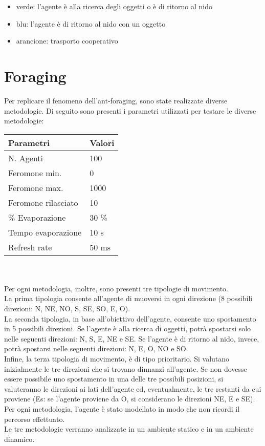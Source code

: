 \documentclass[12pt,a4paper,openright,twoside]{report}
\begin{document}
\begin{itemize}
	\item verde: l'agente è alla ricerca degli oggetti o è di ritorno al nido
	\item blu: l'agente è di ritorno al nido con un oggetto
	\item arancione: trasporto cooperativo
\end{itemize}

\section{Foraging}

Per replicare il fenomeno dell'ant-foraging, sono state realizzate diverse metodologie.
Di seguito sono presenti i parametri utilizzati per testare le diverse metodologie:\\

\begin{tabular}{p{5cm}|p{5cm}} 
	 \textbf{ Parametri} & \textbf{ Valori} \\ \hline
	 N. Agenti & 100 \\
	 Feromone min. & 0 \\
	 Feromone max. & 1000 \\
	 Feromone rilasciato & 10\\
	 \% Evaporazione & 30 \% \\
	 Tempo evaporazione & 10 s \\
	 Refresh rate & 50 ms 
\end{tabular}
\\\\
Per ogni metodologia, inoltre, sono presenti tre tipologie di movimento.\\ La prima tipologia consente all'agente di muoversi in ogni direzione (8 possibili direzioni: N, NE, NO, S, SE, SO, E, O).\\
La seconda tipologia, in base all'obiettivo dell'agente, consente uno spostamento in 5 possibili direzioni. Se l'agente è alla ricerca di oggetti, potrà spostarsi solo nelle seguenti direzioni: N, S, E, NE e SE.  Se l'agente è di ritorno al nido, invece, potrà spostarsi nelle seguenti direzioni: N, E, O, NO e SO.\\
Infine, la terza tipologia di movimento, è di tipo prioritario. Si valutano inizialmente le tre direzioni che si trovano dinnanzi all'agente. Se non dovesse essere possibile uno spostamento in una delle tre possibili posizioni, si valuteranno le direzioni ai lati dell'agente ed, eventualmente, le tre restanti da cui proviene (Es: se l'agente proviene da O, si considerano le direzioni NE, E e SE).\\
Per ogni metodologia, l'agente è stato modellato in modo che non ricordi il percorso effettuato.\\
Le tre metodologie verranno analizzate in un ambiente statico e in un ambiente dinamico.
\end{document}
